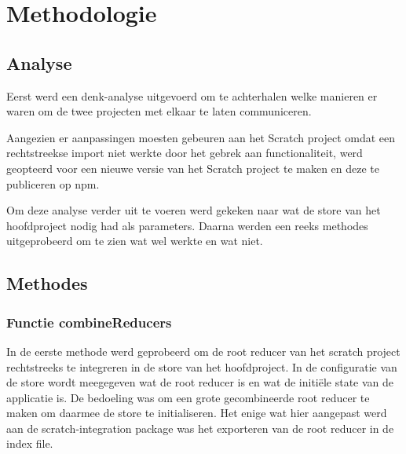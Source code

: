 
\chapter{Methodologie}
\label{ch:methodologie}


\section{Analyse}
Eerst werd een denk-analyse uitgevoerd om te achterhalen welke manieren er waren om de twee projecten met elkaar te laten communiceren.

Aangezien er aanpassingen moesten gebeuren aan het Scratch project omdat een rechtstreekse import niet werkte door het gebrek aan functionaliteit, werd geopteerd voor een nieuwe versie van het Scratch project te maken en deze te publiceren op npm. 

Om deze analyse verder uit te voeren werd gekeken naar wat de store van het hoofdproject nodig had als parameters. Daarna werden een reeks methodes uitgeprobeerd om te zien wat wel werkte en wat niet.


\section{Methodes}
\subsection{Functie combineReducers}
In de eerste methode werd geprobeerd om de root reducer van het scratch project rechtstreeks te integreren in de store van het hoofdproject. In de configuratie van de store wordt meegegeven wat de root reducer is en wat de initiële state van de applicatie is. De bedoeling was om een grote gecombineerde root reducer te maken om daarmee de store te initialiseren. Het enige wat hier aangepast werd aan de scratch-integration package was het exporteren van de root reducer in de index file.

